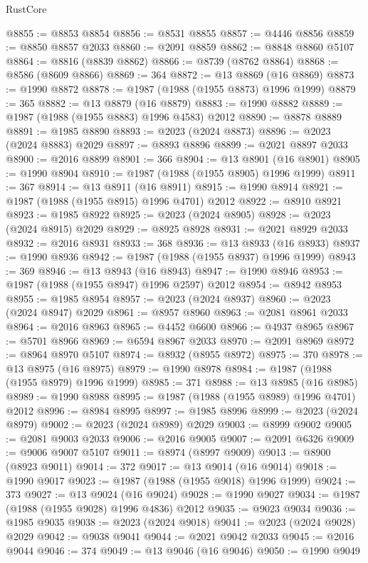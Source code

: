 \begin{lexlean}{RustCore}
\begin{coremodule}
@8855 := @8853 @8854
@8856 := @8531 @8855
@8857 := @4446 @8856
@8859 := @8850 @8857 @2033
@8860 := @2091 @8859
@8862 := @8848 @8860 @5107
@8864 := @8816 (@8839 @8862)
@8866 := @8739 (@8762 @8864)
@8868 := @8586 (@8609 @8866)
@8869 := 364
@8872 := @13 @8869 (@16 @8869)
@8873 := @1990 @8872
@8878 := @1987 (@1988 (@1955 @8873) @1996 @1999)
@8879 := 365
@8882 := @13 @8879 (@16 @8879)
@8883 := @1990 @8882
@8889 := @1987 (@1988 (@1955 @8883) @1996 @4583) @2012
@8890 := @8878 @8889
@8891 := @1985 @8890
@8893 := @2023 (@2024 @8873)
@8896 := @2023 (@2024 @8883) @2029
@8897 := @8893 @8896
@8899 := @2021 @8897 @2033
@8900 := @2016 @8899
@8901 := 366
@8904 := @13 @8901 (@16 @8901)
@8905 := @1990 @8904
@8910 := @1987 (@1988 (@1955 @8905) @1996 @1999)
@8911 := 367
@8914 := @13 @8911 (@16 @8911)
@8915 := @1990 @8914
@8921 := @1987 (@1988 (@1955 @8915) @1996 @4701) @2012
@8922 := @8910 @8921
@8923 := @1985 @8922
@8925 := @2023 (@2024 @8905)
@8928 := @2023 (@2024 @8915) @2029
@8929 := @8925 @8928
@8931 := @2021 @8929 @2033
@8932 := @2016 @8931
@8933 := 368
@8936 := @13 @8933 (@16 @8933)
@8937 := @1990 @8936
@8942 := @1987 (@1988 (@1955 @8937) @1996 @1999)
@8943 := 369
@8946 := @13 @8943 (@16 @8943)
@8947 := @1990 @8946
@8953 := @1987 (@1988 (@1955 @8947) @1996 @2597) @2012
@8954 := @8942 @8953
@8955 := @1985 @8954
@8957 := @2023 (@2024 @8937)
@8960 := @2023 (@2024 @8947) @2029
@8961 := @8957 @8960
@8963 := @2081 @8961 @2033
@8964 := @2016 @8963
@8965 := @4452 @6600
@8966 := @4937 @8965
@8967 := @5701 @8966
@8969 := @6594 @8967 @2033
@8970 := @2091 @8969
@8972 := @8964 @8970 @5107
@8974 := @8932 (@8955 @8972)
@8975 := 370
@8978 := @13 @8975 (@16 @8975)
@8979 := @1990 @8978
@8984 := @1987 (@1988 (@1955 @8979) @1996 @1999)
@8985 := 371
@8988 := @13 @8985 (@16 @8985)
@8989 := @1990 @8988
@8995 := @1987 (@1988 (@1955 @8989) @1996 @4701) @2012
@8996 := @8984 @8995
@8997 := @1985 @8996
@8999 := @2023 (@2024 @8979)
@9002 := @2023 (@2024 @8989) @2029
@9003 := @8999 @9002
@9005 := @2081 @9003 @2033
@9006 := @2016 @9005
@9007 := @2091 @6326
@9009 := @9006 @9007 @5107
@9011 := @8974 (@8997 @9009)
@9013 := @8900 (@8923 @9011)
@9014 := 372
@9017 := @13 @9014 (@16 @9014)
@9018 := @1990 @9017
@9023 := @1987 (@1988 (@1955 @9018) @1996 @1999)
@9024 := 373
@9027 := @13 @9024 (@16 @9024)
@9028 := @1990 @9027
@9034 := @1987 (@1988 (@1955 @9028) @1996 @4836) @2012
@9035 := @9023 @9034
@9036 := @1985 @9035
@9038 := @2023 (@2024 @9018)
@9041 := @2023 (@2024 @9028) @2029
@9042 := @9038 @9041
@9044 := @2021 @9042 @2033
@9045 := @2016 @9044
@9046 := 374
@9049 := @13 @9046 (@16 @9046)
@9050 := @1990 @9049

\end{coremodule}
\end{lexlean}

